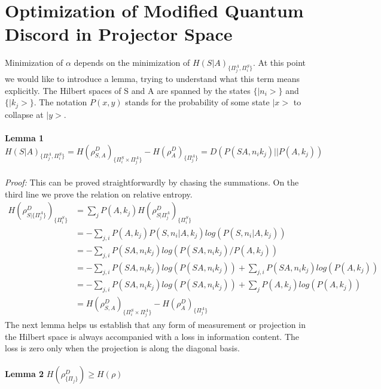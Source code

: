 \documentclass[8pt]{article}
\begin{document}
\section{Optimization of Modified Quantum Discord in Projector Space} 
Minimization of $\alpha$ depends on the minimization of $H(S|A)_{\{{\Pi}^{A}_{j},{\Pi}^{S}_{i}\}}$. At this point we would like to introduce a lemma, trying to understand what this term means explicitly. The Hilbert spaces of S and A are spanned by the states $\{|n_{i}>\}$ and $\{| k_{j}>\}$. The notation $P(x,y)$ stands for the probability of some state $|x>$ to collapse at $|y>$.\\
\\
\textbf{Lemma 1} ${H(S|A)}_{\{{\Pi}^{A}_{j},{\Pi}^{S}_{i}\}} = H(\rho^{\scriptscriptstyle{D}}_{\scriptscriptstyle{{S,A}}})_{\{\Pi^S_{i}\times\Pi^A_{j}\}} - H(\rho^{\scriptscriptstyle{D}}_{\scriptscriptstyle{{A}}})_{\{\Pi^A_{j}\}} = D(P(SA,n_{i}k_{j})||P(A,k_{j}))$\\
\\
\textit{Proof:} This can be proved straightforwardly by chasing the summations. On the third line we prove the relation on relative entropy.
\begin{align*}
H(\rho^{\scriptscriptstyle{D}}_{\scriptscriptstyle{{S|\{\Pi^A_{j}\}}}})_{\{\Pi^S_{i}\}} &= \sum_{j}P(A,k_{j})H(\rho^{\scriptscriptstyle{D}}_{\scriptscriptstyle{{S|\Pi^A_{j}}}})_{\{\Pi^S_{i}\}}\\
&= -\sum_{j,i}P(A,k_{j})P(S,n_{i}|A,k_{j})log(P(S,n_{i}|A,k_{j}))\\
&= -\sum_{j,i}P(SA,n_{i}k_{j})log(P(SA,n_{i}k_{j})/P(A,k_{j}))\\
&= -\sum_{j,i}P(SA,n_{i}k_{j})log(P(SA,n_{i}k_{j})) + \sum_{j,i}P(SA,n_{i}k_{j})log(P(A,k_{j}))\\
&= -\sum_{j,i}P(SA,n_{i}k_{j})log(P(SA,n_{i}k_{j})) + \sum_{j}P(A,k_{j})log(P(A,k_{j}))\\
&=  H(\rho^{\scriptscriptstyle{D}}_{\scriptscriptstyle{{S,A}}})_{\{\Pi^S_{i}\times\Pi^A_{j}\}} - H(\rho^{\scriptscriptstyle{D}}_{\scriptscriptstyle{{A}}})_{\{\Pi^A_{j}\}}
\end{align*}
The next lemma helps us establish that any form of measurement or projection in the Hilbert space is always accompanied with a loss in information content. The loss is zero only when the projection is along the diagonal basis.\\
\\
\textbf{Lemma 2} $H(\rho^{\scriptscriptstyle{D}}_{\{{\Pi_{j}\}}}) \geq H(\rho)$\\
\end{document}

